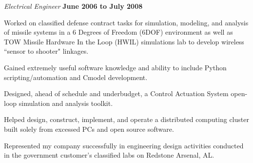 \documentclass[8pt]{article}
\newenvironment{outerlist}[1][\enskip\textbullet]%
       {\begin{compactenum}[#1]}{\end{compactenum}%
        \vspace{-.3\baselineskip}}
\newenvironment{innerlist}[1][\enskip\textbullet]%
        {\begin{compactenum}[#1]}{\end{compactenum}}
\newcommand{\blankline}{\quad\pagebreak[2]}
\def\CC{{C\nolinebreak[4]\hspace{-.05em}\raisebox{.4ex}{\tiny\bf ++}}}
\begin{document}
\begin{outerlist}
\item[] \textit{Electrical Engineer}%
        \hfill \textbf{June 2006 to July 2008}
\begin{innerlist}
\item Worked on classified defense contract tasks for simulation, modeling,
      and analysis of missile systems in a 6 Degrees of Freedom (6DOF) environment
      as well as TOW Missile Hardware In the Loop (HWIL) simulations lab to develop wireless ``sensor to shooter" linkages.
\item Gained extremely useful software knowledge and ability to include Python scripting/automation and \CC model development.
\item Designed, ahead of schedule and underbudget, a Control Actuation System open-loop simulation and analysis toolkit.
\item Helped design, construct, implement, and operate a distributed computing cluster built solely from excessed PCs and open source software.
\item Represented my company successfully in engineering design activities conducted in the government customer's classified labs on Redstone Arsenal, AL.
\end{innerlist}
\end{outerlist}
\blankline
\end{document}
